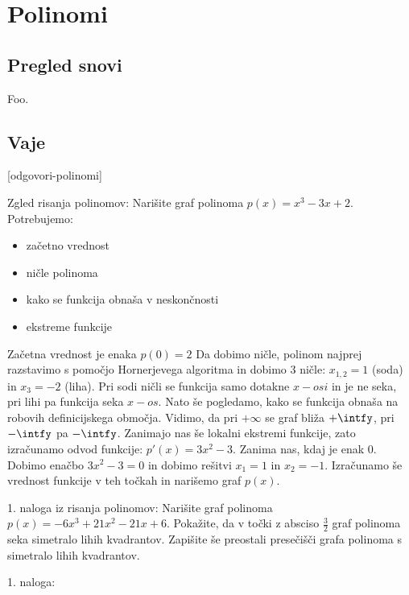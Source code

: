 \chapter{Polinomi}
\label{cha:polinomi}

\section{Pregled snovi}
\label{sec:polinomi-pregled-snovi}

Foo.

\section{Vaje}
\label{sec:polinomi-funkcije-vaje}


[odgovori-polinomi]

\begin{vaja}
Zgled risanja polinomov:
Narišite graf polinoma $p(x)=x^3-3x+2$.
Potrebujemo:
\begin{itemize}
\item začetno vrednost
\item ničle polinoma
\item kako se funkcija obnaša v neskončnosti
\item ekstreme funkcije
\end{itemize}

Začetna vrednost je enaka $p(0)=2$
Da dobimo ničle, polinom najprej razstavimo s pomočjo Hornerjevega algoritma in dobimo 3 ničle:
$x_{1,2}=1$ (soda) in $x_3=-2$ (liha). Pri sodi ničli se funkcija samo dotakne $x-osi$ in je ne seka, pri lihi pa
funkcija seka $x-os$.
Nato še pogledamo, kako se funkcija obnaša na robovih definicijskega območja. Vidimo, da pri $+\infty$ se graf bliža $+\intfy$,
pri $-\intfy$ pa $-\intfy$.
Zanimajo nas še lokalni ekstremi funkcije, zato izračunamo odvod funkcije: $p\prime(x)=3x^2-3$. Zanima nas, kdaj je enak $0$. Dobimo enačbo $3x^2-3=0$ in dobimo rešitvi $x_1=1$ in $x_2=-1$. Izračunamo še vrednost funkcije v teh točkah in narišemo graf $p(x)$.
\end{vaja}

\begin{vaja}
1. naloga iz risanja polinomov:
Narišite graf polinoma $p(x)=-6x^3+21x^2-21x+6$. Pokažite, da v točki z absciso $\frac{3}{2}$ graf polinoma 
seka simetralo lihih kvadrantov. Zapišite še preostali presečišči grafa polinoma s simetralo lihih kvadrantov.



  \begin{odgovor}
1. naloga: %

  \end{odgovor}

\end{vaja}




